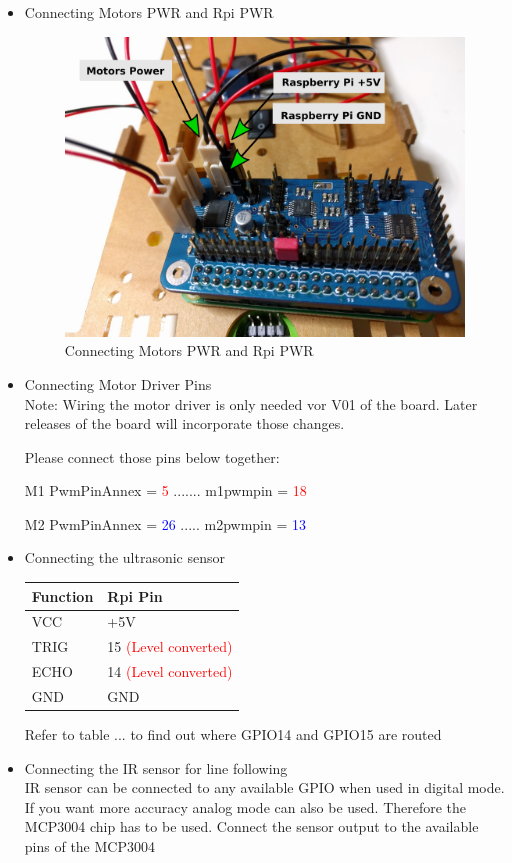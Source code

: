 \documentclass[
12pt, %
a4paper, %
oneside, %
headinclude,footinclude, %
BCOR5mm, %
table,
]{scrartcl}
\begin{document}
\begin{itemize}
\item Connecting Motors PWR and Rpi PWR \\
	\begin{figure}[H]
	\centering
	\includegraphics[scale=0.2]{Figures/ConnectPWR.png}
	\caption{Connecting Motors PWR and Rpi PWR}
	\label{Connecting Motors PWR and Rpi PWR }
	\end{figure}

\item Connecting Motor Driver Pins\\
Note: Wiring the motor driver is only needed vor V01 of the board. Later releases of the board will incorporate those changes. 

Please connect those pins below together:

    M1 PwmPinAnnex = \textcolor{red}{5}    .......   m1pwmpin = \textcolor{red}{18}
    
    M2 PwmPinAnnex = \textcolor{blue}{26}   .....  m2pwmpin = \textcolor{blue}{13}
    
    
\item Connecting the ultrasonic sensor
	\begin{table}[H]
	\centering
	\begin{tabular}{ll}
	\hline
	   Function & Rpi Pin\\
	\hline
		VCC & +5V\\
		TRIG & 15 \textcolor{red}{(Level converted)}\\
		ECHO & 14 \textcolor{red}{(Level converted)}\\
		GND & GND\\
	\hline
	\end{tabular}
	\end{table}
Refer to table ... to find out where GPIO14 and GPIO15 are routed
\item Connecting the IR sensor for line following \\ 
IR sensor can be connected to any available GPIO when used in digital mode. If you want more accuracy analog mode can also be used. Therefore the MCP3004 chip has to be used. Connect the sensor output to the available pins of the MCP3004
\end{itemize}
\end{document}
